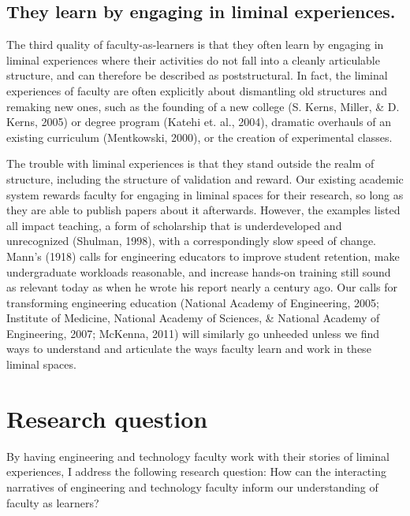 \subsection{They learn by engaging in liminal experiences.}

The third quality of faculty-as-learners is that they often learn by engaging in liminal experiences where their activities do not fall into a cleanly articulable structure, and can therefore be described as poststructural. In fact, the liminal experiences of faculty are often explicitly about dismantling old structures and remaking new ones, such as the founding of a new college (S. Kerns, Miller, & D. Kerns, 2005) or degree program (Katehi et. al., 2004), dramatic overhauls of an existing curriculum (Mentkowski, 2000), or the creation of experimental classes.

The trouble with liminal experiences is that they stand outside the realm of structure, including the structure of validation and reward. Our existing academic system rewards faculty for engaging in liminal spaces for their research, so long as they are able to publish papers about it afterwards. However, the examples listed all impact teaching, a form of scholarship that is underdeveloped and unrecognized (Shulman, 1998), with a correspondingly slow speed of change. Mann’s (1918) calls for engineering educators to improve student retention, make undergraduate workloads reasonable, and increase hands-on training still sound as relevant today as when he wrote his report nearly a century ago. Our calls for transforming engineering education (National Academy of Engineering, 2005; Institute of Medicine, National Academy of Sciences, & National Academy of Engineering, 2007; McKenna, 2011) will similarly go unheeded unless we find ways to understand and articulate the ways faculty learn and work in these liminal spaces.

\section{Research question}

By having engineering and technology faculty work with their stories of liminal experiences, I address the following research question: How can the interacting narratives of engineering and technology faculty inform our understanding of faculty as learners?

